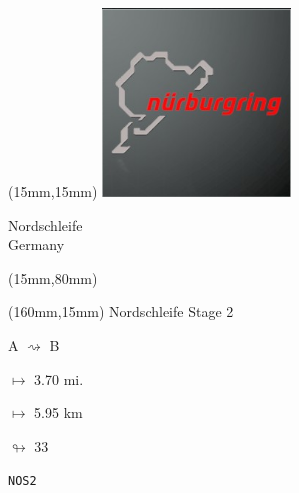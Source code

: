 \begin{textblock*}{50mm}(15mm,15mm)%
\includegraphics[width=50mm]{LG/2015-05-20_00088.png}
\par Nordschleife\\ Germany
\end{textblock*}
\begin{textblock*}{185mm}(15mm,80mm)%
\end{textblock*}
\begin{textblock*}{40mm}(160mm,15mm)%
Nordschleife Stage 2
\par A $\rightsquigarrow$ B
\Large
\par$\mapsto$ 3.70 mi.
\par$\mapsto$ 5.95 km
\par$\looparrowright$ 33
\par\hfill\tiny\tt NOS2\\
\end{textblock*}
\null\newpage

